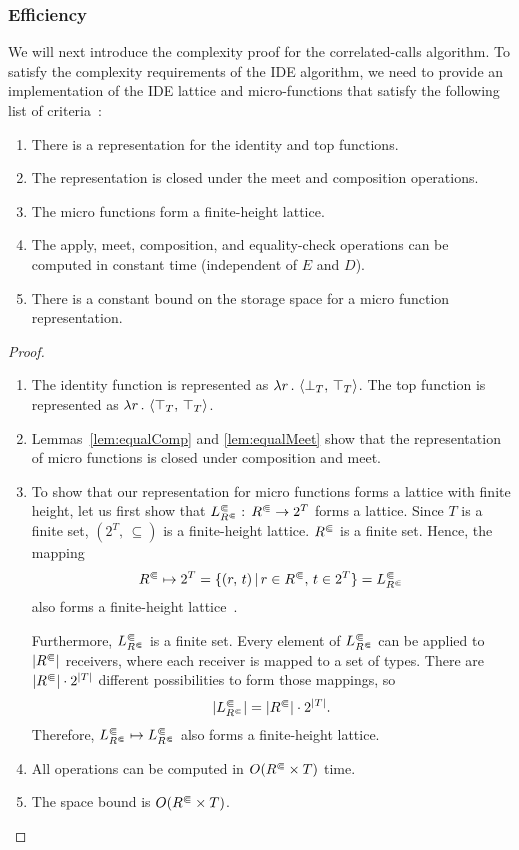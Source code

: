 \subsubsection*{Efficiency}
We will next introduce the complexity proof for the correlated-calls algorithm.
To satisfy the complexity requirements of the IDE algorithm, we need to provide
an implementation of the IDE lattice and micro-functions that satisfy the following
list of criteria~\cite{sagiv1996precise}:
\begin{enumerate}
	\item There is a representation for the identity and top functions.
  \item The representation is closed under the meet and composition operations.
  \item The micro functions form a finite-height lattice.
  \item The apply, meet, composition, and equality-check operations can be computed in constant time (independent of $E$ and $D$).
  \item There is a constant bound on the storage space for a micro function representation.
\end{enumerate}
\efficient*
\begin{proof}
\leavevmode
  \begin{enumerate}
    \item The identity function is represented as $\lambda r\,.\,\left\langle \bot_T,\,\top_T\right\rangle$. 
    The top function is represented as $\lambda r\,.\,\left\langle \top_T,\,\top_T\right\rangle$.
    \item Lemmas~\ref{lem:equalComp} and \ref{lem:equalMeet} show that the representation of micro functions is closed under composition and meet.
    \item To show that our representation for micro functions forms a lattice with finite height, let us first show that $L^\Subset_{R^\Subset}:\,{R^\Subset}\to2^T$ forms a lattice. Since $T$ is a finite set, $(2^T,\,\subseteq)$ is a finite-height lattice. ${R^\Subset}$ is a finite set. Hence, the mapping
    \[
      {R^\Subset}\mapsto2^T=\{(r,\,t)\,|\,r\in {R^\Subset},\,t\in 2^T\}=L^\Subset_{R^\Subset}
    \]        
    also forms a finite-height lattice~\cite{nielson1999principles}. 
    
    Furthermore, $L^\Subset_{R^\Subset}$ is a finite set. 
    Every element of $L^\Subset_{R^\Subset}$ can be applied to $|{R^\Subset}|$ receivers, where each receiver is mapped to a set of types. There are $|{R^\Subset}|\cdot2^{|T|}$ different possibilities to form those mappings, so
    \[
      |L^\Subset_{R^\Subset}|=|{R^\Subset}|\cdot2^{|T|}.
    \]
    Therefore, $L^\Subset_{R^\Subset}\mapsto L^\Subset_{R^\Subset}$ also forms a finite-height lattice.
    \item All operations can be computed in $O({R^\Subset}\times T)$ time. %
    \item The space bound is $O({R^\Subset}\times T)$.\qedhere
  \end{enumerate}
\end{proof}

